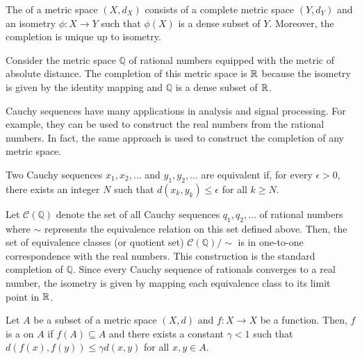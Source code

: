 \begin{definition}
The  of a metric space $(X,d_X)$ consists of a complete metric space $(Y,d_Y)$ and an isometry $\phi  \colon X \rightarrow Y$ such that $\phi(X)$ is a dense subset of $Y$.
Moreover, the completion is unique up to isometry.
\end{definition}

\begin{example}
Consider the metric space $\mathbb{Q}$ of rational numbers equipped with the metric of absolute distance.
The completion of this metric space is $\mathbb{R}$ because the isometry is given by the identity mapping and $\mathbb{Q}$ is a dense subset of $\mathbb{R}$.
\end{example}

Cauchy sequences have many applications in analysis and signal processing.
For example, they can be used to construct the real numbers from the rational numbers.
In fact, the same approach is used to construct the completion of any metric space.

\begin{definition}
Two Cauchy sequences $x_1, x_2, \ldots$ and $y_1, y_2, \ldots$ are equivalent if, for every $\epsilon >0$, there exists an integer $N$ such that $d (x_k, y_k) \leq \epsilon$ for all $k \geq N$.
\end{definition}

\begin{example}
Let $\mathcal{C}(\mathbb{Q})$ denote the set of all Cauchy sequences $q_1, q_2, \ldots$ of rational numbers where $\sim$ represents the equivalence relation on this set defined above.
Then, the set of equivalence classes (or quotient set) $\mathcal{C}(\mathbb{Q}) / \! \sim$ is in one-to-one correspondence with the real numbers.
This construction is the standard completion of $\mathbb{Q}$.
Since every Cauchy sequence of rationals converges to a real number, the isometry is given by mapping each equivalence class to its limit point in $\mathbb{R}$.
\end{example}

\begin{definition}
Let $A$ be a subset of a metric space $(X,d)$ and $f \colon X \rightarrow X$ be a function.
Then, $f$ is a  on $A$ if $f(A) \subseteq A$ and there exists a constant $\gamma < 1$ such that $d \left( f(x),f(y) \right) \leq \gamma  d(x,y)$ for all $x,y\in A$.
\end{definition}

